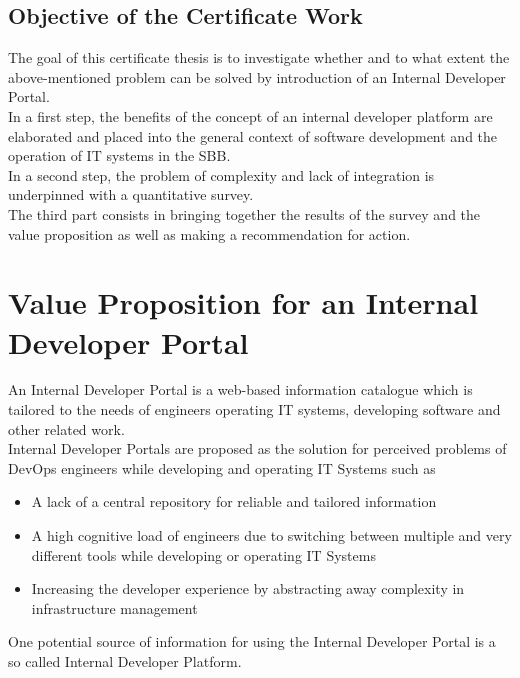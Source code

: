 \documentclass[a4paper,12pt]{article}
\begin{document}
    \subsection{Objective of the Certificate Work}
    \label{subsec:iobjective}
    The goal of this certificate thesis is to investigate whether and to what extent the above-mentioned problem
    can be solved by introduction of an Internal Developer Portal.\\
    In a first step, the benefits of the concept of an internal developer platform are elaborated and placed
    into the general context of software development and the operation of IT systems in the SBB.\\
    In a second step, the problem of complexity and lack of integration is underpinned with a quantitative survey.\\
    The third part consists in bringing together the results of the survey and the value proposition as well as making a
    recommendation for action.


    \section{Value Proposition for an Internal Developer Portal}
    \label{sec:vp}
    An Internal Developer Portal is a web-based information catalogue which is tailored to the needs of
    engineers operating IT systems, developing software and other related work.\\
    Internal Developer Portals are proposed as the solution for perceived problems\parencite{backstagestory} of DevOps
    engineers while developing and operating IT Systems such as
    \begin{itemize}
        \item A lack of a central repository for reliable and tailored information
        \item A high cognitive load of engineers due to switching between multiple and very different tools while developing or operating IT Systems
        \item Increasing the developer experience by abstracting away complexity in infrastructure management
    \end{itemize}
    One potential source of information for using the Internal Developer Portal is a so called Internal Developer Platform.
\end{document}
